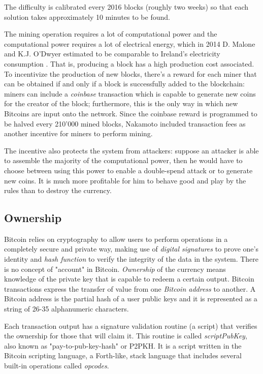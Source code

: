		The difficulty is calibrated every 2016 blocks (roughly two weeks) so that each solution takes approximately 10 minutes to be found. 
		
		The mining operation requires a lot of computational power and the computational power requires a lot of electrical energy, which in 2014 D. Malone and  K.J. O'Dwyer estimated to be comparable to Ireland's electricity consumption \cite{Malone2014}. That is, producing a block has a high production cost associated. To incentivize the production of new blocks, there's a reward for each miner that can be obtained if and only if a block is successfully added to the blockchain: miners can include a \textit{coinbase} transaction which is capable to generate new coins for the creator of the block; furthermore, this is the only way in which new Bitcoins are input onto the network. Since the coinbase reward is programmed to be halved every 210'000 mined blocks, Nakamoto included transaction fees as another incentive for miners to perform mining.
		
		The incentive also protects the system from attackers: suppose an attacker is able to assemble the majority of the computational power, then he would have to choose between using this power to enable a double-spend attack or to generate new coins. It is much more profitable for him to behave good and play by the rules than to destroy the currency.
		
		\newpage
		
		\subsection{Ownership}
		
		Bitcoin relies on cryptography to allow users to perform operations in a completely secure and private way, making use of \textit{digital signatures} to prove one's identity and \textit{hash function} to verify the integrity of the data in the system.
		There is no concept of "account" in Bitcoin. \textit{Ownership} of the currency means knowledge of the private key that is capable to redeem a certain output. 	Bitcoin transactions express the transfer of value from one \textit{Bitcoin address} to another. A Bitcoin address is the partial hash of a user public keys and it is represented as a string of 26-35 alphanumeric characters.
		
		Each transaction output has a signature validation routine (a script) that verifies the ownership for those that will claim it. This routine is called \textit{scriptPubKey}, also known as "pay-to-pub-key-hash" or P2PKH. It is a script written in the Bitcoin scripting language, a Forth-like, stack language that includes several built-in operations called \textit{opcodes}. 
		
